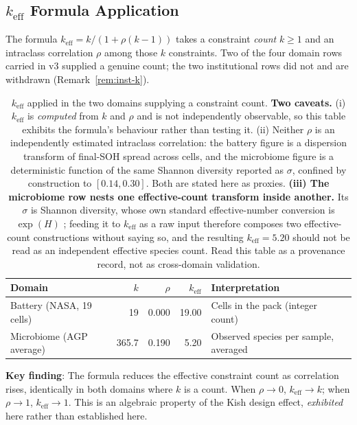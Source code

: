 \documentclass[11pt,a4paper]{article}
\theoremstyle{definition}
\theoremstyle{remark}
\newcommand{\keff}{k_{\text{eff}}}
\begin{document}
\subsection{$\keff$ Formula Application}

The formula $\keff = k/(1 + \rho(k-1))$ takes a constraint \emph{count} $k \geq 1$ and an intraclass correlation $\rho$ among those $k$ constraints. Two of the four domain rows carried in v3 supplied a genuine count; the two institutional rows did not and are withdrawn (Remark~\ref{rem:inst-k}).

\begin{table}[H]
\centering
\begin{tabular}{lrrrl}
\toprule
\textbf{Domain} & \textbf{$k$} & \textbf{$\rho$} & \textbf{$\keff$} & \textbf{Interpretation} \\
\midrule
Battery (NASA, 19 cells) & 19 & 0.000 & 19.00 & Cells in the pack (integer count) \\
Microbiome (AGP average) & 365.7 & 0.190 & 5.20 & Observed species per sample, averaged \\
\bottomrule
\end{tabular}
\caption{$\keff$ applied in the two domains supplying a constraint count. \textbf{Two caveats.} (i) $\keff$ is \textit{computed} from $k$ and $\rho$ and is not independently observable, so this table exhibits the formula's behaviour rather than testing it. (ii) Neither $\rho$ is an independently estimated intraclass correlation: the battery figure is a dispersion transform of final-SOH spread across cells, and the microbiome figure is a deterministic function of the same Shannon diversity reported as $\sigma$, confined by construction to $[0.14, 0.30]$. Both are stated here as proxies. \textbf{(iii) The microbiome row nests one effective-count transform inside another.} Its $\sigma$ is Shannon diversity, whose own standard effective-number conversion is $\exp(H)$ \cite{jost2006}; feeding it to $\keff$ as a raw input therefore composes two effective-count constructions without saying so, and the resulting $\keff = 5.20$ should not be read as an independent effective species count. Read this table as a provenance record, not as cross-domain validation.}
\label{tab:keff-application}
\end{table}

\textbf{Key finding}: The formula reduces the effective constraint count as correlation rises, identically in both domains where $k$ is a count. When $\rho \to 0$, $\keff \to k$; when $\rho \to 1$, $\keff \to 1$. This is an algebraic property of the Kish design effect, \emph{exhibited} here rather than established here.
\end{document}
